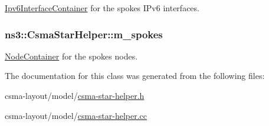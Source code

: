 \hyperlink{classns3_1_1Ipv6InterfaceContainer}{Ipv6\+Interface\+Container} for the spokes I\+Pv6 interfaces. 

\subsubsection[{\texorpdfstring{m\+\_\+spokes}{m_spokes}}]{ ns3\+::\+Csma\+Star\+Helper\+::m\+\_\+spokes\hspace{0.3cm}{\ttfamily [private]}}\hypertarget{classns3_1_1CsmaStarHelper_a30e9ab531c8e1148f016d11dc0d9cd11}{}\label{classns3_1_1CsmaStarHelper_a30e9ab531c8e1148f016d11dc0d9cd11}


\hyperlink{classns3_1_1NodeContainer}{Node\+Container} for the spokes nodes. 



The documentation for this class was generated from the following files\+:\begin{DoxyCompactItemize}
\item 
csma-\/layout/model/\hyperlink{csma-star-helper_8h}{csma-\/star-\/helper.\+h}\item 
csma-\/layout/model/\hyperlink{csma-star-helper_8cc}{csma-\/star-\/helper.\+cc}\end{DoxyCompactItemize}
